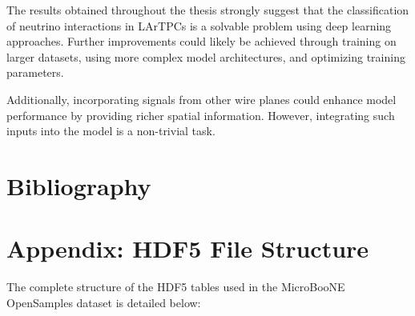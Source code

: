 \documentclass{pracalicmgr}
\begin{document}
The results obtained throughout the thesis strongly suggest that the classification of neutrino interactions in LArTPCs is a solvable problem using deep learning approaches. Further improvements could likely be achieved through training on larger datasets, using more complex model architectures, and optimizing training parameters.

Additionally, incorporating signals from other wire planes could enhance model performance by providing richer spatial information. However, integrating such inputs into the model is a non-trivial task.

\newpage



\listoffigures
\newpage

\listoftables
\newpage

\section*{Bibliography}


\newpage

\appendix

\section*{Appendix: HDF5 File Structure}
\label{app:hdf5_structure}

The complete structure of the HDF5 tables used in the MicroBooNE OpenSamples dataset is detailed below:
\end{document}
